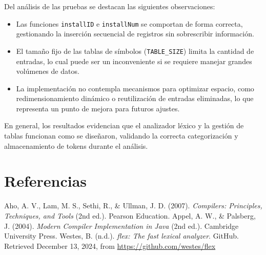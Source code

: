 \documentclass{article}
\begin{document}
Del análisis de las pruebas se destacan las siguientes observaciones:

\begin{itemize}
  \item Las funciones \texttt{installID} e \texttt{installNum} se comportan de forma correcta, gestionando la inserción secuencial de registros sin sobrescribir información.
  \item El tamaño fijo de las tablas de símbolos (\texttt{TABLE\_SIZE}) limita la cantidad de entradas, lo cual puede ser un inconveniente si se requiere manejar grandes volúmenes de datos.
  \item La implementación no contempla mecanismos para optimizar espacio, como redimensionamiento dinámico o reutilización de entradas eliminadas, lo que representa un punto de mejora para futuros ajustes.
\end{itemize}

En general, los resultados evidencian que el analizador léxico y la gestión de tablas funcionan como se diseñaron, validando la correcta categorización y almacenamiento de tokens durante el análisis.

\section{Referencias}
\renewcommand{\refname}{}
\begin{thebibliography}{9}
Aho, A. V., Lam, M. S., Sethi, R., \& Ullman, J. D. (2007). \textit{Compilers: Principles, Techniques, and Tools} (2nd ed.). Pearson Education.
Appel, A. W., \& Palsberg, J. (2004). \textit{Modern Compiler Implementation in Java} (2nd ed.). Cambridge University Press.
Westes, B. (n.d.). \textit{flex: The fast lexical analyzer}. GitHub. Retrieved December 13, 2024, from \url{https://github.com/westes/flex}

\end{thebibliography}
\end{document}

